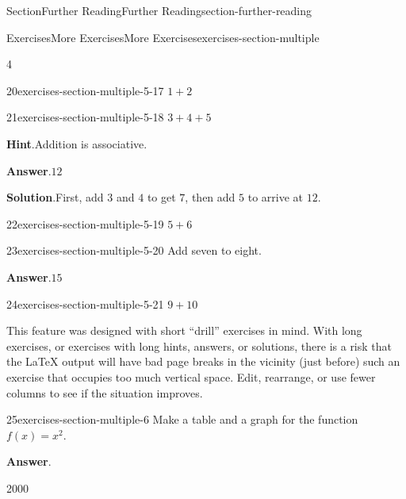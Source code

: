 \documentclass[twoside,10pt,]{article}
\newcommand{\blocktitlefont}{\relax}
\numberwithin{equation}{section}
\begin{document}
\begin{sectionptx}{Section}{Further Reading}{}{Further Reading}{}{}{section-further-reading}
\begin{exercises-subsection}{Exercises}{More Exercises}{}{More Exercises}{}{}{exercises-section-multiple}
\begin{exercisegroupcol}{4}
\begin{divisionexerciseegcol}{20}{}{}{exercises-section-multiple-5-17}%
\(1+2\)%
\end{divisionexerciseegcol}%
\begin{divisionexerciseegcol}{21}{}{}{exercises-section-multiple-5-18}%
\(3+4+5\)%
\par\smallskip%
\noindent\textbf{\blocktitlefont Hint}.\hypertarget{exercises-section-multiple-5-18-2}{}\quad{}Addition is associative.%
\par\smallskip%
\noindent\textbf{\blocktitlefont Answer}.\hypertarget{exercises-section-multiple-5-18-3}{}\quad{}\(12\)%
\par\smallskip%
\noindent\textbf{\blocktitlefont Solution}.\hypertarget{exercises-section-multiple-5-18-4}{}\quad{}First, add \(3\) and \(4\) to get \(7\), then add \(5\) to arrive at \(12\).%
\end{divisionexerciseegcol}%
\begin{divisionexerciseegcol}{22}{}{}{exercises-section-multiple-5-19}%
\(5+6\)%
\end{divisionexerciseegcol}%
\begin{divisionexerciseegcol}{23}{}{}{exercises-section-multiple-5-20}%
Add seven to eight.%
\par\smallskip%
\noindent\textbf{\blocktitlefont Answer}.\hypertarget{exercises-section-multiple-5-20-2}{}\quad{}\(15\)%
\end{divisionexerciseegcol}%
\begin{divisionexerciseegcol}{24}{}{}{exercises-section-multiple-5-21}%
\(9+10\)%
\end{divisionexerciseegcol}%
\end{exercisegroupcol}
\par\noindent%
This feature was designed with short ``drill'' exercises in mind.  With long exercises, or exercises with long hints, answers, or solutions, there is a risk that the \LaTeX{} output will have bad page breaks in the vicinity (just before) such an exercise that occupies too much vertical space.  Edit, rearrange, or use fewer columns to see if the situation improves.%
\par\medskip\noindent
\begin{divisionexercise}{25}{}{}{exercises-section-multiple-6}%
Make a table and a graph for the function \(f(x)=x^2\).%
\par\smallskip%
\noindent\textbf{\blocktitlefont Answer}.\hypertarget{exercises-section-multiple-6-2}{}\quad{}\begin{sidebyside}{2}{0}{0}{0}%

\end{sidebyside}
\end{divisionexercise}
\end{exercises-subsection}
\end{sectionptx}
\end{document}
